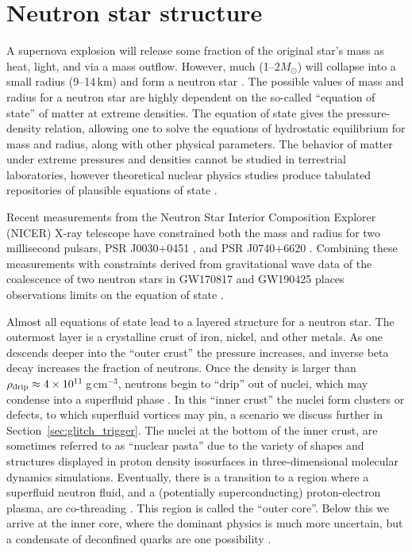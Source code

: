 \section{Neutron star structure} \label{sec:intro_struc}
A supernova explosion will release some fraction of the original star's mass as heat, light, and via a mass outflow. However, much (1--2$M_\odot$) will collapse into a small radius (9--14\,km) and form a neutron star \citep{Shapiro1983}. The possible values of mass and radius for a neutron star are highly dependent on the so-called ``equation of state'' of matter at extreme densities. The equation of state gives the pressure-density relation, allowing one to solve the equations of hydrostatic equilibrium for mass and radius, along with other physical parameters. The behavior of matter under extreme pressures and densities cannot be studied in terrestrial laboratories, however theoretical nuclear physics studies produce tabulated repositories of plausible equations of state \citep{Ishizuka2015,Typel2015}. 

Recent measurements from the Neutron Star Interior Composition Explorer (NICER) X-ray telescope have constrained both the mass and radius for two millisecond pulsars, PSR J0030$+$0451 \citep{Riley2019a,Miller2019a}, and PSR J0740$+$6620 \citep{Riley2021,Miller2021}. Combining these measurements with constraints derived from gravitational wave data of the coalescence of two neutron stars in GW170817 and GW190425 places observations limits on the equation of state \citep{gw170817eos,Raaijmakers2019,Raaijmakers2021,Pang2021}.

Almost all equations of state lead to a layered structure for a neutron star. The outermost layer is a crystalline crust of iron, nickel, and other metals. As one descends deeper into the ``outer crust'' the pressure increases, and inverse beta decay increases the fraction of neutrons. Once the density is larger than $\rho_{\rm drip} \approx 4\times10^{11}\,$g\,cm$^{-3}$, neutrons begin to ``drip'' out of nuclei, which may condense into a superfluid phase \citep{Chamel2008}. In this ``inner crust'' the nuclei form clusters or defects, to which superfluid vortices may pin, a scenario we discuss further in Section~\ref{sec:glitch_trigger}. The nuclei at the bottom of the inner crust, are sometimes referred to as ``nuclear pasta'' \citep{Ravenhall1983,Watanabe2000,Horowitz2015} due to the variety of shapes and structures displayed in proton density isosurfaces in three-dimensional molecular dynamics simulations. Eventually, there is a transition to a region where a superfluid neutron fluid, and a (potentially superconducting) proton-electron plasma, are co-threading \citep{Shapiro1983,Chamel2008}. This region is called the ``outer core''. Below this we arrive at the inner core, where the dominant physics is much more uncertain, but a condensate of deconfined quarks are one possibility \citep{Alford2003}. 

